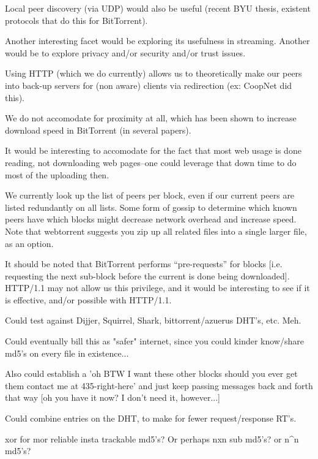Local peer discovery (via UDP) would also be useful (recent BYU thesis, existent protocols that do this for BitTorrent).

Another interesting facet would be exploring its usefulness in streaming.  Another would be to explore privacy and/or security and/or trust issues.

Using HTTP (which we do currently) allows us to theoretically make our peers into back-up servers for (non aware) clients via redirection (ex: CoopNet did this).

We do not accomodate for proximity at all, which has been shown to increase download speed in BitTorrent (in several papers).

It would be interesting to accomodate for the fact that most web usage is done reading, not downloading web pages--one could leverage that down time to do most of the uploading then.

We currently look up the list of peers per block, even if our current peers are listed redundantly on all lists.  Some form of gossip to determine which known peers have which blocks might decrease network overhead and increase speed.  Note that webtorrent suggests you zip up all related files into a single larger file, as an option.

It should be noted that BitTorrent performs ``pre-requests'' for blocks [i.e. requesting the next sub-block before the current is done being downloaded].   HTTP/1.1 may not allow us this privilege, and it would be interesting to see if it is effective, and/or possible with HTTP/1.1.

Could test against Dijjer, Squirrel, Shark,  bittorrent/azuerus DHT's, etc. Meh.

Could eventually bill this as "safer" internet, since you could kinder know/share md5's on every file in existence...

Also could establish a 'oh BTW I want these other blocks should you
ever get them contact me at 435-right-here' and just keep passing
messages back and forth that way [oh you have it now? I don't need it,
however...]

Could combine entries on the DHT, to make for fewer request/response RT's.

xor for mor reliable insta trackable md5's? Or perhaps nxn sub md5's? or n^n md5's?
